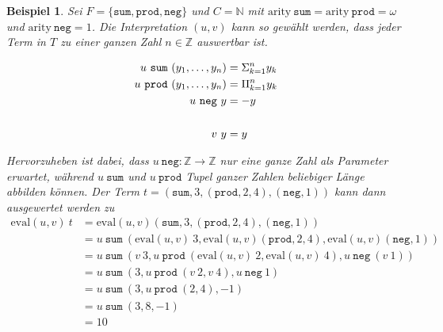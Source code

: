 \newtheorem{bEval}[bsp]{Beispiel}
\begin{bEval} \label{bEval}
Sei $F = \{\texttt{sum}, \texttt{prod}, \texttt{neg} \}$ und $C = \mathbb{N}$ mit $\mathrm{arity}~ \texttt{sum} = \mathrm{arity}~ \texttt{prod} = \omega$ und $\mathrm{arity}~ \texttt{neg} = 1$.
Die Interpretation $(u, v)$ kann so gewählt werden, dass jeder Term in $T$ zu einer ganzen Zahl $n \in \mathbb{Z}$ auswertbar ist.

\begin{equation*}
    \begin{split}
    u~\texttt{sum}  ~({y}_{1}, \dots, {y}_{n}) &= \Sigma_{k = 1}^n y_k\\
    u~\texttt{prod} ~({y}_{1}, \dots, {y}_{n}) &=    \Pi_{k = 1}^n y_k\\
    u~\texttt{neg}~y &= -y\\
    &\\
    v~y &= y
    \end{split}
\end{equation*}

Hervorzuheben ist dabei, dass $u~\texttt{neg} \colon \mathbb Z \rightarrow \mathbb Z$ nur eine ganze Zahl als Parameter erwartet, während $u~\texttt{sum}$ und $u~\texttt{prod}$ Tupel ganzer Zahlen beliebiger Länge abbilden können.
Der Term $t = (\texttt{sum}, 3, (\texttt{prod}, 2, 4), (\texttt{neg}, 1))$ kann dann ausgewertet werden zu 
\begin{equation*}
    \begin{split}
    \mathrm{eval}(u, v)~t &= \mathrm{eval}(u, v) (\texttt{sum}, 3, (\texttt{prod}, 2, 4), (\texttt{neg}, 1)) \\
    &= u~\texttt{sum}~(\mathrm{eval}(u, v)~3, \mathrm{eval}(u, v)(\texttt{prod}, 2, 4),  \mathrm{eval}(u, v) (\texttt{neg}, 1)) \\
    &= u~\texttt{sum}~(v~3, u~\texttt{prod}~(\mathrm{eval}(u, v)~2, \mathrm{eval}(u, v)~4), u~\texttt{neg}~ (v~1)) \\
    &= u~\texttt{sum}~(3, u~\texttt{prod}~(v~2, v~4), u~\texttt{neg}~ 1) \\
    &= u~\texttt{sum}~(3, u~\texttt{prod}~(2, 4), -1) \\
    &= u~\texttt{sum}~( 3, 8, -1) \\
    &= 10 \\
    \end{split}
\end{equation*}
\end{bEval}


